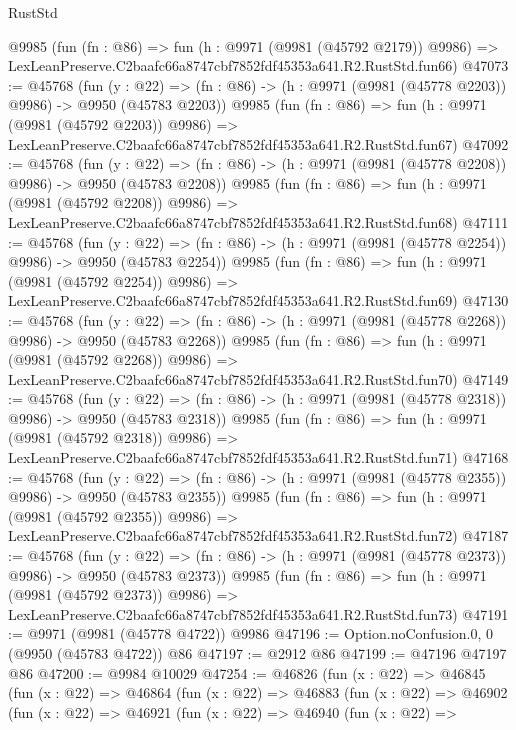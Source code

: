 \begin{lexlean}{RustStd}
\begin{coremodule}
    @9985
    (fun (fn : @86) =>
    fun (h : @9971 (@9981 (@45792 @2179)) @9986) =>
    LexLeanPreserve.C2baafc66a8747cbf7852fdf45353a641.R2.RustStd.fun66)
@47073 := @45768
    (fun (y : @22) =>
    (fn : @86) -> (h : @9971 (@9981 (@45778 @2203)) @9986) -> @9950 (@45783 @2203))
    @9985
    (fun (fn : @86) =>
    fun (h : @9971 (@9981 (@45792 @2203)) @9986) =>
    LexLeanPreserve.C2baafc66a8747cbf7852fdf45353a641.R2.RustStd.fun67)
@47092 := @45768
    (fun (y : @22) =>
    (fn : @86) -> (h : @9971 (@9981 (@45778 @2208)) @9986) -> @9950 (@45783 @2208))
    @9985
    (fun (fn : @86) =>
    fun (h : @9971 (@9981 (@45792 @2208)) @9986) =>
    LexLeanPreserve.C2baafc66a8747cbf7852fdf45353a641.R2.RustStd.fun68)
@47111 := @45768
    (fun (y : @22) =>
    (fn : @86) -> (h : @9971 (@9981 (@45778 @2254)) @9986) -> @9950 (@45783 @2254))
    @9985
    (fun (fn : @86) =>
    fun (h : @9971 (@9981 (@45792 @2254)) @9986) =>
    LexLeanPreserve.C2baafc66a8747cbf7852fdf45353a641.R2.RustStd.fun69)
@47130 := @45768
    (fun (y : @22) =>
    (fn : @86) -> (h : @9971 (@9981 (@45778 @2268)) @9986) -> @9950 (@45783 @2268))
    @9985
    (fun (fn : @86) =>
    fun (h : @9971 (@9981 (@45792 @2268)) @9986) =>
    LexLeanPreserve.C2baafc66a8747cbf7852fdf45353a641.R2.RustStd.fun70)
@47149 := @45768
    (fun (y : @22) =>
    (fn : @86) -> (h : @9971 (@9981 (@45778 @2318)) @9986) -> @9950 (@45783 @2318))
    @9985
    (fun (fn : @86) =>
    fun (h : @9971 (@9981 (@45792 @2318)) @9986) =>
    LexLeanPreserve.C2baafc66a8747cbf7852fdf45353a641.R2.RustStd.fun71)
@47168 := @45768
    (fun (y : @22) =>
    (fn : @86) -> (h : @9971 (@9981 (@45778 @2355)) @9986) -> @9950 (@45783 @2355))
    @9985
    (fun (fn : @86) =>
    fun (h : @9971 (@9981 (@45792 @2355)) @9986) =>
    LexLeanPreserve.C2baafc66a8747cbf7852fdf45353a641.R2.RustStd.fun72)
@47187 := @45768
    (fun (y : @22) =>
    (fn : @86) -> (h : @9971 (@9981 (@45778 @2373)) @9986) -> @9950 (@45783 @2373))
    @9985
    (fun (fn : @86) =>
    fun (h : @9971 (@9981 (@45792 @2373)) @9986) =>
    LexLeanPreserve.C2baafc66a8747cbf7852fdf45353a641.R2.RustStd.fun73)
@47191 := @9971 (@9981 (@45778 @4722)) @9986
@47196 := Option.noConfusion.{0, 0} (@9950 (@45783 @4722)) @86
@47197 := @2912 @86
@47199 := @47196 @47197 @86
@47200 := @9984 @10029
@47254 := @46826
    (fun (x : @22) =>
    @46845
      (fun (x : @22) =>
      @46864
        (fun (x : @22) =>
        @46883
          (fun (x : @22) =>
          @46902
            (fun (x : @22) =>
            @46921
              (fun (x : @22) =>
              @46940
                (fun (x : @22) =>

\end{coremodule}
\end{lexlean}
